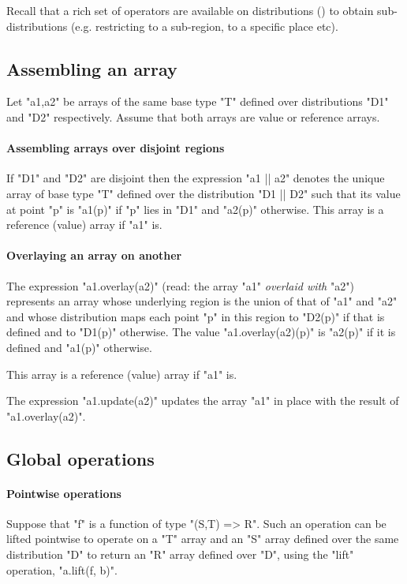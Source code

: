 Recall that a rich set of operators are available on distributions
() to obtain sub-distributions
(e.g. restricting to a sub-region, to a specific place etc).

\subsection{Assembling an array}
Let \xcd"a1,a2" be arrays of the same base type \xcd"T" defined over
distributions \xcd"D1" and \xcd"D2" respectively. Assume that both
arrays are value or reference arrays. 
\paragraph{Assembling arrays over disjoint regions}

If \xcd"D1" and \xcd"D2" are disjoint then the expression \xcd"a1 || a2" denotes the unique array of base type \xcd"T" defined over the
distribution \xcd"D1 || D2" such that its value at point \xcd"p" is
\xcd"a1(p)" if \xcd"p" lies in \xcd"D1" and \xcd"a2(p)"
otherwise. This array is a reference (value) array if \xcd"a1" is.

\paragraph{Overlaying an array on another}
The expression
\xcd"a1.overlay(a2)" (read: the array \xcd"a1" {\em overlaid with} \xcd"a2")
represents an array whose underlying region is the union of that of
\xcd"a1" and \xcd"a2" and whose distribution maps each point \xcd"p"
in this region to \xcd"D2(p)" if that is defined and to \xcd"D1(p)"
otherwise. The value \xcd"a1.overlay(a2)(p)" is \xcd"a2(p)" if it is defined and \xcd"a1(p)" otherwise.

This array is a reference (value) array if \xcd"a1" is.

The expression \xcd"a1.update(a2)" updates the array \xcd"a1" in place
with the result of \xcd"a1.overlay(a2)".



\subsection{Global operations }

\paragraph{Pointwise operations}\label{ArrayPointwise}
Suppose that \xcd"f" is a function of type \xcd"(S,T) => R".
Such an operation can be lifted pointwise to operate on a \xcd"T"
array and an \xcd"S" array defined over the same distribution \xcd"D"
to return an \xcd"R" array defined over \xcd"D", using the
\xcd"lift" operation, \xcd"a.lift(f, b)".


